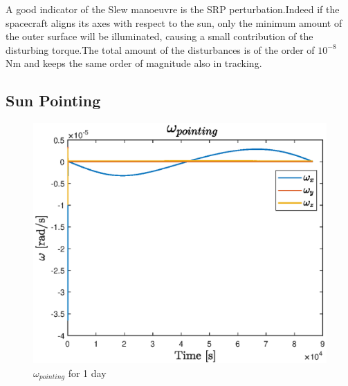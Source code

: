 \documentclass[11pt]{article}
\begin{document}
A good indicator of the Slew manoeuvre is the SRP perturbation.Indeed if the spacecraft aligns its axes with respect to the sun, only the minimum amount of the outer surface will be illuminated, causing a small  contribution of the disturbing torque.The total amount of the disturbances is of the order of $10^{-8}$ Nm and keeps the same order of magnitude also in tracking.
\subsection{Sun Pointing}
\begin{minipage}{.5 \textwidth}
\begin{figure} [H]
\centering 
\includegraphics[scale=0.62]{w_pointing.eps}
\caption{ $\omega_{pointing}$  for  1  day}
\end{figure}
\end{minipage}
\end{document}
